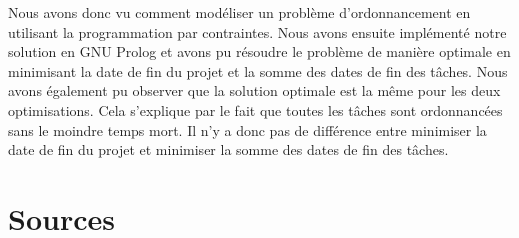 \documentclass{latexPackage/utc-report/utc-report}
\begin{document}
Nous avons donc vu comment modéliser un problème d'ordonnancement en utilisant la programmation par contraintes. Nous avons ensuite implémenté notre solution en GNU Prolog et avons pu résoudre le problème de manière optimale en minimisant la date de fin du projet et la somme des dates de fin des tâches. Nous avons également pu observer que la solution optimale est la même pour les deux optimisations. Cela s'explique par le fait que toutes les tâches sont ordonnancées sans le moindre temps mort. Il n'y a donc pas de différence entre minimiser la date de fin du projet et minimiser la somme des dates de fin des tâches.

\pagebreak

\section{Sources}

\pagebreak

\listoffigures
\end{document}
